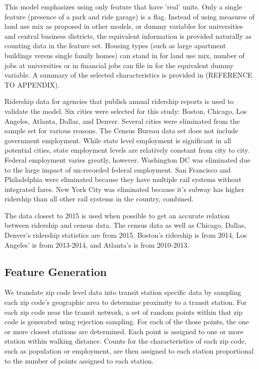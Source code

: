 \documentclass{article}
\begin{document}
This model emphasizes using only feature that have 'real' units. Only a single feature (presence of a park and ride garage) is a flag. Instead of using measures of land use mix as proposed in other models\cite{Durning2015, Gutierrez2011}, or dummy variables for universities and central business districts, the equivalent information is provided naturally as counting data in the feature set. Housing types (such as large apartment buildings versus single family homes) can stand in for land use mix, number of jobs at universities or in financial jobs can file in for the equivalent dummy variable. A summary of the selected characteristics is provided in (REFERENCE TO APPENDIX).

Ridership data for agencies that publish annual ridership reports is used to validate the model. Six cities were selected for this study: Boston, Chicago, Los Angeles, Atlanta, Dallas, and Denver. Several cities were eliminated from the sample set for various reasons. The Census Bureau data set does not include government employment. While state level employment is significant in all potential cities, state employment levels are relatively constant from city to city. Federal employment varies greatly, however. Washington DC was eliminated due to the large impact of un-recorded federal employment. San Francisco and Philadelphia were eliminated because they have multiple rail systems without integrated fares. New York City was eliminated because it's subway has higher ridership than all other rail systems in the country, combined. 

The data closest to 2015 is used when possible to get an accurate relation between ridership and census data. The census data as well as Chicago, Dallas, Denver's ridership statistics are from 2015. Boston's ridership is from 2014, Los Angeles' is from 2013-2014, and Atlanta's is from 2010-2013. 



\subsection{Feature Generation}

We translate zip code level data into transit station specific data by sampling each zip code's geographic area to determine proximity to a transit station. For each zip code near the transit network, a set of random points within that zip code is generated using rejection sampling. For each of the those points, the one or more closest stations are determined. Each point is assigned to one or more station within walking distance. Counts for the characteristics of each zip code, such as population or employment, are then assigned to each station proportional to the number of points assigned to each station.
\end{document}
